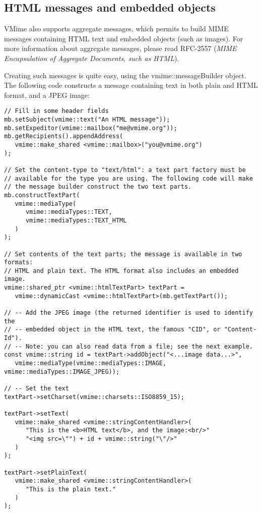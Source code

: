 \subsection{HTML messages and embedded objects} %

VMime also supports aggregate messages, which permits to build MIME messages
containing HTML text and embedded objects (such as images). For more information
about aggregate messages, please read RFC-2557 (\emph{MIME Encapsulation of
Aggregate Documents, such as HTML}).

Creating such messages is quite easy, using the {\vcode vmime::messageBuilder}
object. The following code constructs a message containing text in both plain
and HTML format, and a JPEG image:

\begin{lstlisting}[caption={Building an HTML message with an embedded image
using the {\vcode vmime::messageBuilder}}]
// Fill in some header fields
mb.setSubject(vmime::text("An HTML message"));
mb.setExpeditor(vmime::mailbox("me@vmime.org"));
mb.getRecipients().appendAddress(
   vmime::make_shared <vmime::mailbox>("you@vmime.org")
);

// Set the content-type to "text/html": a text part factory must be
// available for the type you are using. The following code will make
// the message builder construct the two text parts.
mb.constructTextPart(
   vmime::mediaType(
      vmime::mediaTypes::TEXT,
      vmime::mediaTypes::TEXT_HTML
   )
);

// Set contents of the text parts; the message is available in two formats:
// HTML and plain text. The HTML format also includes an embedded image.
vmime::shared_ptr <vmime::htmlTextPart> textPart =
   vmime::dynamicCast <vmime::htmlTextPart>(mb.getTextPart());

// -- Add the JPEG image (the returned identifier is used to identify the
// -- embedded object in the HTML text, the famous "CID", or "Content-Id").
// -- Note: you can also read data from a file; see the next example.
const vmime::string id = textPart->addObject("<...image data...>",
   vmime::mediaType(vmime::mediaTypes::IMAGE, vmime::mediaTypes::IMAGE_JPEG));

// -- Set the text
textPart->setCharset(vmime::charsets::ISO8859_15);

textPart->setText(
   vmime::make_shared <vmime::stringContentHandler>(
      "This is the <b>HTML text</b>, and the image:<br/>"
      "<img src=\"") + id + vmime::string("\"/>"
   )
);

textPart->setPlainText(
   vmime::make_shared <vmime::stringContentHandler>(
      "This is the plain text."
   )
);
\end{lstlisting}

